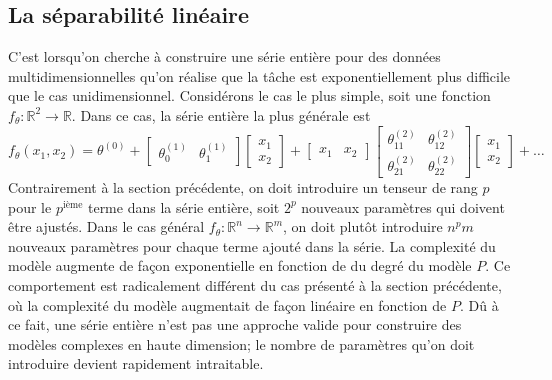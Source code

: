 \subsection{La séparabilité linéaire}
C'est lorsqu'on cherche à construire une série entière pour des données multidimensionnelles qu'on réalise que la tâche 
est exponentiellement plus difficile que le cas unidimensionnel. Considérons le cas le plus simple, soit une fonction 
$f_\theta : \mathbb{R}^2 \rightarrow \mathbb{R}$. Dans ce cas, la série entière la plus générale est
\begin{equation}\label{eq:multidim expansion}
        f_\theta(x_1, x_2) = \theta^{(0)} 
        + 
        \begin{bmatrix}
                \theta^{(1)}_0 & \theta^{(1)}_1 
        \end{bmatrix}
        \begin{bmatrix}
               x_1 \\
               x_2
        \end{bmatrix}
        +
        \begin{bmatrix}
                x_1 & x_2 
        \end{bmatrix}
        \begin{bmatrix}
                \theta^{(2)}_{11} & \theta^{(2)}_{12} \\
                \theta^{(2)}_{21} & \theta^{(2)}_{22}
        \end{bmatrix}
        \begin{bmatrix}
                x_1 \\ x_2
        \end{bmatrix}
        + \dots
\end{equation} 
Contrairement à la section précédente, on doit introduire un tenseur de rang $p$ pour le $p^{\text{ième}}$ terme dans la série entière, 
soit $2^p$ nouveaux paramètres qui doivent être ajustés. Dans le cas général $f_\theta: \mathbb{R}^n \rightarrow \mathbb{R}^m$,
on doit plutôt introduire $n^pm$ nouveaux paramètres pour chaque terme ajouté dans la série. 
La complexité du modèle augmente de façon exponentielle en fonction de du degré du modèle $P$.
Ce comportement est radicalement différent du cas présenté à la section précédente, où la complexité du modèle augmentait de façon linéaire en fonction de $P$. 
Dû à ce fait, une série entière n'est pas une approche valide pour construire des modèles complexes en haute dimension; 
le nombre de paramètres qu'on doit introduire devient rapidement intraitable.


